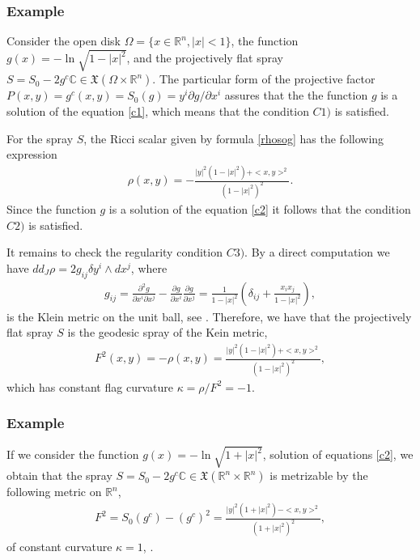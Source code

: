 \documentclass[oneside,english]{amsart}
\numberwithin{equation}{section}
\numberwithin{figure}{section}
\theoremstyle{plain}
\theoremstyle{plain}
\theoremstyle{definition}
\theoremstyle{plain}
\theoremstyle{plain}
\theoremstyle{plain}
\theoremstyle{remark}
\theoremstyle{remark}
\begin{document}
\subsubsection{Example} \label{ssc:ex1} Consider the open disk $\Omega=\{x\in \mathbb{R}^n, |x|<1\}$, the
function $g(x)=-\ln \sqrt{1-|x|^2}$, and the projectively flat  spray
$S=S_0-2g^c\mathbb{C}\in \mathfrak{X}(\Omega \times
\mathbb{R}^n)$. 
The particular form of the projective factor
$P(x,y)=g^c(x,y)=S_0(g)=y^i \partial g/\partial x^i$ assures that
the the function $g$ is a solution of the equation \eqref{c1}, which
means that the condition $C1)$ is satisfied.

For the spray $S$, the Ricci scalar given by formula
\eqref{rhosog} has the following expression
\begin{eqnarray}
  \rho(x,y)=-\frac{|y|^2(1-|x|^2)+<x,y>^2}{(1-|x|^2)^2}. \label{rhoklein}
\end{eqnarray}
Since the function $g$ is a solution of the equation
\eqref{c2} it follows that the condition $C2)$ is satisfied. 

It remains to check the regularity condition $C3)$. By a
direct computation we have $dd_J\rho = 2g_{ij}\delta y^i \wedge dx^j$,
where 
\begin{eqnarray}
  g_{ij} = \frac{\partial^2 g}{\partial x^i\partial x^j}  - \frac{\partial
    g}{\partial x^i} \frac{\partial g}{\partial x^j} =
  \frac{1}{1-|x|^2}\left(\delta_{ij} +
    \frac{x_ix_j}{1-|x|^2}\right), \end{eqnarray} is the Klein
metric on the unit ball, see \cite[Example
11.3.1]{Shen01}.
Therefore, we have that the projectively flat spray $S$ is the
geodesic spray of the Kein metric, 
\begin{eqnarray} F^2(x,y)=-\rho(x,y)=  \frac{|y|^2(1-|x|^2)+<x,y>^2}{(1-|x|^2)^2}, \label{fklein}
\end{eqnarray}
which has constant flag curvature $\kappa=\rho/F^2=-1$.

\subsubsection{Example} \label{ssc:ex2} If we consider the function
$g(x)=-\ln\sqrt{1+|x|^2}$, solution of equations \eqref{c2}, we obtain that the
spray $S=S_0-2g^c\mathbb{C}\in \mathfrak{X}(\mathbb{R}^n\times
\mathbb{R}^n)$ is metrizable by the following metric on
$\mathbb{R}^n$, 
\begin{eqnarray}
  F^2=S_0(g^c)-(g^c)^2=\frac{|y|^2(1+|x|^2) -
    <x,y>^2}{(1+|x|^2)^2}, \label{fpos} \end{eqnarray}
of constant curvature $\kappa=1$, \cite[Example
11.3.2]{Shen01}.
\end{document}
